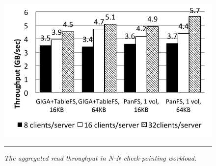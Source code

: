 \begin{figure}[t]  %
\centerline{\includegraphics[scale=0.6]{./figs/checkpointing_read}}
\vspace{10pt}
\caption{\normalsize
\textit{
The aggregated read throughput in N-N check-pointing workload.
}
}
\vspace{10pt}
\hrule
\label{graph:ldb-singlenode}
\end{figure}       %

